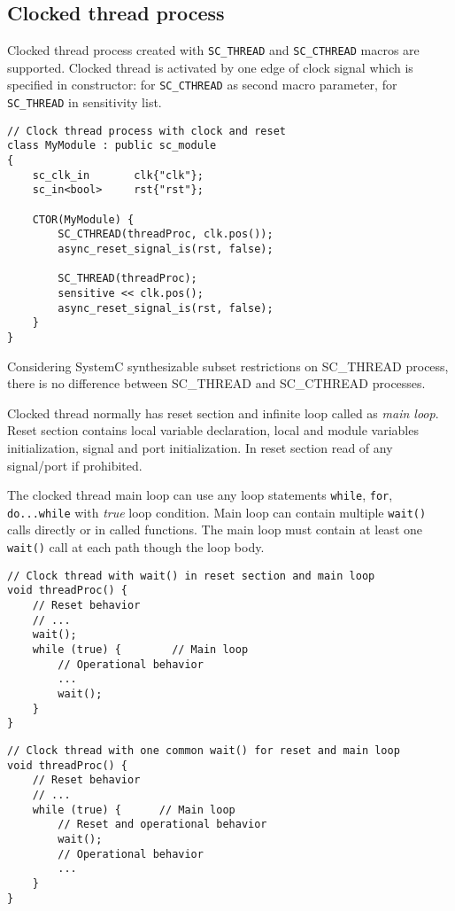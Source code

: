\subsection{Clocked thread process}

Clocked thread process created with {\tt SC\_THREAD} and {\tt SC\_CTHREAD} macros are supported.  
Clocked thread is activated by one edge of clock signal which is specified in constructor: for {\tt SC\_CTHREAD} as second macro parameter, for {\tt SC\_THREAD} in sensitivity list. 
%
\begin{lstlisting}[style=mycpp]
// Clock thread process with clock and reset
class MyModule : public sc_module 
{
    sc_clk_in       clk{"clk"};
    sc_in<bool>     rst{"rst"};
    
	CTOR(MyModule) {
        SC_CTHREAD(threadProc, clk.pos());
        async_reset_signal_is(rst, false);
        
        SC_THREAD(threadProc);
        sensitive << clk.pos();
        async_reset_signal_is(rst, false);
	}     
}
\end{lstlisting}
%
Considering SystemC synthesizable subset restrictions on SC\_THREAD process, there is no difference between SC\_THREAD and SC\_CTHREAD processes.

Clocked thread normally has reset section and infinite loop called as \emph{main loop}. Reset section contains local variable declaration, local and module variables initialization, signal and port initialization. In reset section read of any signal/port if prohibited.

The clocked thread main loop can use any loop statements {\tt while}, {\tt for}, {\tt do...while} with \emph{true} loop condition. Main loop can contain multiple {\tt wait()} calls directly or in called functions. The main loop must contain at least one {\tt wait()} call at each path though the loop body. 
%
\begin{lstlisting}[style=mycpp]
// Clock thread with wait() in reset section and main loop
void threadProc() {
    // Reset behavior
    // ...
    wait();
    while (true) {        // Main loop
        // Operational behavior
        ...
        wait();
    }
}
\end{lstlisting}

\begin{lstlisting}[style=mycpp]
// Clock thread with one common wait() for reset and main loop
void threadProc() {
    // Reset behavior
    // ...
    while (true) {      // Main loop
        // Reset and operational behavior
        wait();
        // Operational behavior
        ...
    }
}
\end{lstlisting}

